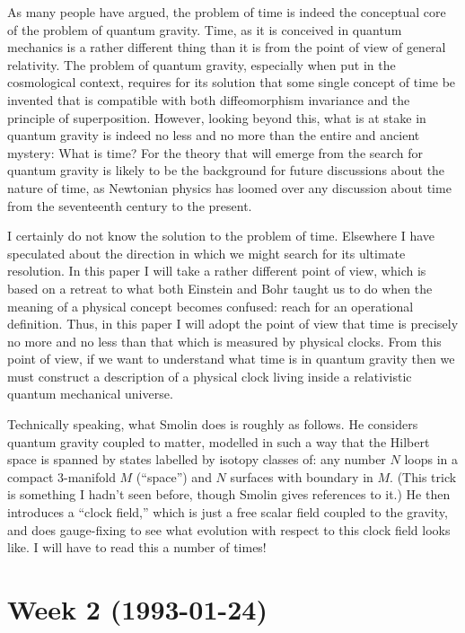 \documentclass{article}
\begin{document}
As many people have argued, the problem of time is indeed the conceptual
core of the problem of quantum gravity. Time, as it is conceived in
quantum mechanics is a rather different thing than it is from the point
of view of general relativity. The problem of quantum gravity,
especially when put in the cosmological context, requires for its
solution that some single concept of time be invented that is compatible
with both diffeomorphism invariance and the principle of superposition.
However, looking beyond this, what is at stake in quantum gravity is
indeed no less and no more than the entire and ancient mystery: What is
time? For the theory that will emerge from the search for quantum
gravity is likely to be the background for future discussions about the
nature of time, as Newtonian physics has loomed over any discussion
about time from the seventeenth century to the present.

I certainly do not know the solution to the problem of time. Elsewhere I
have speculated about the direction in which we might search for its
ultimate resolution. In this paper I will take a rather different point
of view, which is based on a retreat to what both Einstein and Bohr
taught us to do when the meaning of a physical concept becomes confused:
reach for an operational definition. Thus, in this paper I will adopt
the point of view that time is precisely no more and no less than that
which is measured by physical clocks. From this point of view, if we
want to understand what time is in quantum gravity then we must
construct a description of a physical clock living inside a relativistic
quantum mechanical universe.

Technically speaking, what Smolin does is roughly as follows. He
considers quantum gravity coupled to matter, modelled in such a way that
the Hilbert space is spanned by states labelled by isotopy classes of:
any number \(N\) loops in a compact 3-manifold \(M\) (``space'') and
\(N\) surfaces with boundary in \(M\). (This trick is something I hadn't
seen before, though Smolin gives references to it.) He then introduces a
``clock field,'' which is just a free scalar field coupled to the
gravity, and does gauge-fixing to see what evolution with respect to
this clock field looks like. I will have to read this a number of times!
\hypertarget{week2}{%
\section{Week 2 (1993-01-24)}\label{week2}}
\end{document}
